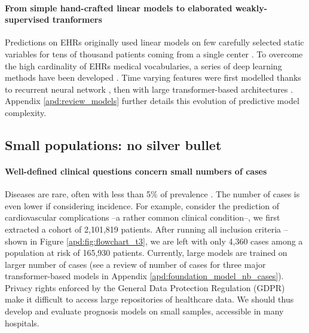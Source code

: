 \documentclass[french,12pt,twoside,a4paper]{book}
\begin{document}

\paragraph{From simple hand-crafted linear models to elaborated weakly-supervised tranformers}

Predictions on EHRs originally used linear models on few carefully selected
static variables for tens of thousand patients coming from a single center
\citep{goldstein2017opportunities}. To overcome the high cardinality of EHRs
medical vocabularies, a series of deep learning methods have been developed
\citep{shickel2017deep}. Time varying features were first modelled thanks to
recurrent neural network \citep{lipton2016learning}, then with large transformer-based
architectures \citep{li2020behrt}. Appendix \ref{apd:review_models} further
details this evolution of predictive model complexity.



\subsection{Small populations: no silver bullet}%
\label{subsec:predictive_models:low_prevalence}%

\paragraph{Well-defined clinical questions concern small numbers of cases}
Diseases are rare, often with less than 5\% of prevalence
\citep{cnam2023pathologies}. The number of cases is even lower if considering
incidence. For example, consider the prediction of cardiovascular complications
--a rather common clinical condition--, we first extracted a cohort of 2,101,819
patients. After running all inclusion criteria --shown in Figure
\ref{apd:fig:flowchart_t3}, we are left with only 4,360 cases among a population
at risk of 165,930 patients. Currently, large models are trained on larger
number of cases (see a review of number of cases for three major
transformer-based models in Appendix \ref{apd:foundation_model_nb_cases}).
Privacy rights enforced by the General Data Protection Regulation (GDPR) make it
difficult to access large repositories of healthcare data. We should thus
develop and evaluate prognosis models on small samples, accessible in many
hospitals.
\end{document}
